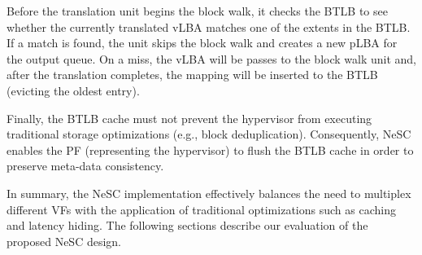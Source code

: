 Before the translation unit begins the block walk, it checks the BTLB to see whether the currently translated vLBA matches one of the extents in the BTLB. If a match is found, the unit skips the block walk and creates a new pLBA for the output queue.
On a miss, the vLBA will be passes to the block walk unit and, after the translation completes, the mapping will be inserted to the BTLB (evicting the oldest entry).

Finally, the BTLB cache must not prevent the hypervisor from executing traditional storage optimizations (e.g., block deduplication). Consequently, NeSC enables the PF (representing the hypervisor) to flush the BTLB cache in order to preserve meta-data consistency.


In summary, the NeSC implementation effectively balances the need to multiplex different VFs with the application of traditional optimizations such as caching and latency hiding. The following sections describe our evaluation of the proposed NeSC design.
